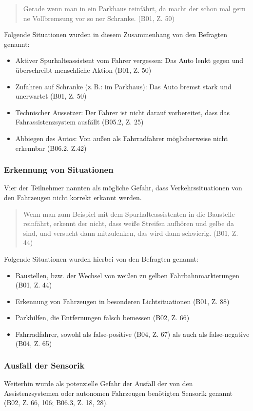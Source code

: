 \documentclass[12pt]{article}
\begin{document}
\begin{quote}
  Gerade wenn man in ein Parkhaus reinfährt, da macht der schon mal gern ne Vollbremsung vor so ner Schranke. (B01, Z. 50)
\end{quote}

Folgende Situationen wurden in diesem Zusammenhang von den Befragten genannt:
\begin{itemize}
  \item Aktiver Spurhalteassistent vom Fahrer vergessen: Das Auto lenkt gegen und \glqq überschreibt\grqq{} menschliche Aktion (B01, Z. 50)
  \item Zufahren auf Schranke (z.\,B.: im Parkhaus): Das Auto bremst stark und unerwartet (B01, Z. 50)
  \item Technischer Aussetzer: Der Fahrer ist nicht darauf vorbereitet, dass das Fahrassistenzsystem ausfällt (B05.2, Z. 25)
  \item Abbiegen des Autos: Von außen als Fahrradfahrer möglicherweise nicht erkennbar (B06.2, Z.42)
\end{itemize}

\subsubsection*{Erkennung von Situationen}
Vier der Teilnehmer nannten als mögliche Gefahr, dass Verkehrssituationen von den Fahrzeugen nicht korrekt erkannt werden.

\begin{quote}
  Wenn man zum Beispiel mit dem Spurhalteassistenten in die Baustelle reinfährt, erkennt der nicht, dass weiße Streifen aufhören und gelbe da sind, und versucht dann mitzulenken, das wird dann schwierig. (B01, Z. 44)
\end{quote}

Folgende Situationen wurden hierbei von den Befragten genannt:
\begin{itemize}
  \item Baustellen, bzw. der Wechsel von weißen zu gelben Fahrbahnmarkierungen (B01, Z. 44)
  \item Erkennung von Fahrzeugen in besonderen Lichtsituationen (B01, Z. 88)
  \item Parkhilfen, die Entfernungen falsch bemessen (B02, Z. 66)
  \item Fahrradfahrer, sowohl als false-positive (B04, Z. 67) als auch als false-negative (B04, Z. 65)
\end{itemize}

\subsubsection*{Ausfall der Sensorik}
Weiterhin wurde als potenzielle Gefahr der Ausfall der von den Assistenzsystemen oder autonomen Fahrzeugen benötigten Sensorik genannt (B02, Z. 66, 106; B06.3, Z. 18, 28).
\end{document}
